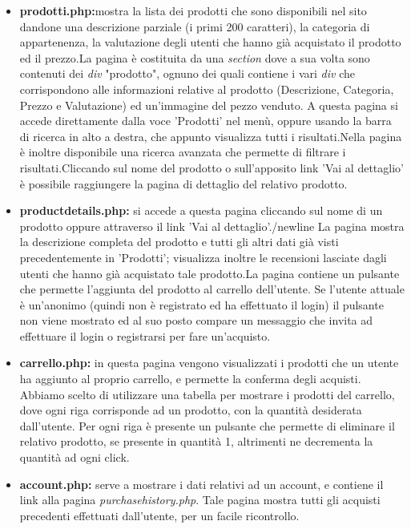 \begin{itemize}
\item \textbf{prodotti.php:}mostra la lista dei prodotti che sono disponibili nel sito dandone una descrizione parziale (i primi 200 caratteri), la categoria di appartenenza, la valutazione degli utenti che hanno già acquistato il prodotto ed il prezzo.\newline La pagina è costituita da una \emph{section} dove a sua volta sono contenuti dei \emph{div} "prodotto", ognuno dei quali contiene i vari \emph{div} che corrispondono alle informazioni relative al prodotto (Descrizione, Categoria, Prezzo e Valutazione) ed un'immagine del pezzo venduto. A questa pagina si accede direttamente dalla voce 'Prodotti' nel menù, oppure usando la barra di ricerca in alto a destra, che appunto visualizza tutti i risultati.\newline Nella pagina è inoltre disponibile una ricerca avanzata che permette di filtrare i risultati.\newline Cliccando sul nome del prodotto o sull'apposito link 'Vai al dettaglio' è possibile raggiungere la pagina di dettaglio del relativo prodotto.

\item \textbf{productdetails.php:} si accede a questa pagina cliccando sul nome di un prodotto oppure attraverso il link 'Vai al dettaglio'./newline La pagina mostra la descrizione completa del prodotto e tutti gli altri dati già visti precedentemente in 'Prodotti'; visualizza inoltre le recensioni lasciate dagli utenti che hanno già acquistato tale prodotto.\newline La pagina contiene un pulsante che permette l'aggiunta del prodotto al carrello dell'utente. Se l'utente attuale è un'anonimo (quindi non è registrato ed ha effettuato il login) il pulsante non viene mostrato ed al suo posto compare un messaggio che invita ad effettuare il login o registrarsi per fare un'acquisto. 

\item \textbf{carrello.php:} in questa pagina vengono visualizzati i prodotti che un utente ha aggiunto al proprio carrello, e permette la conferma degli acquisti. Abbiamo scelto di utilizzare una tabella per mostrare i prodotti del carrello, dove ogni riga corrisponde ad un prodotto, con la quantità desiderata dall'utente. Per ogni riga è presente un pulsante che permette di eliminare il relativo prodotto, se presente in quantità 1, altrimenti ne decrementa la quantità ad ogni click.

\item \textbf{account.php:} serve a mostrare i dati relativi ad un account, e contiene il link alla pagina \textit{purchasehistory.php}.
Tale pagina mostra tutti gli acquisti precedenti effettuati dall'utente, per un facile ricontrollo.


\end{itemize}
